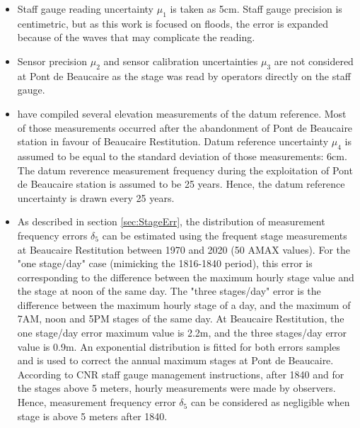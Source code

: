\documentclass[11pt]{article}
\begin{document}
    \begin{itemize}
    
        \item Staff gauge reading uncertainty $\mu_1$ is taken as 5cm. Staff gauge precision is centimetric, but as this work is focused on floods, the error is expanded because of the waves that may complicate the reading. 
        
        \item Sensor precision $\mu_2$ and sensor calibration uncertainties $\mu_3$ are not considered at Pont de Beaucaire as the stage was read by operators directly on the staff gauge.
        
        \item \citet{bard_actualisation_2018} have compiled several elevation measurements of the datum reference. Most of those measurements occurred after the abandonment of Pont de Beaucaire station in favour of Beaucaire Restitution. Datum reference uncertainty $\mu_4$ is assumed to be equal to the standard deviation of those measurements: 6cm. The datum reverence measurement frequency during the exploitation of Pont de Beaucaire station is assumed to be 25 years. Hence, the datum reference uncertainty is drawn every 25 years.
        
        \item As described in section \ref{sec:StageErr}, the distribution of measurement frequency errors $\delta_5$ can be estimated using the frequent stage measurements at Beaucaire Restitution between 1970 and 2020 (50 AMAX values). For the "one stage/day" case (mimicking the 1816-1840 period), this error is corresponding to the difference between the maximum hourly stage value and the stage at noon of the same day. The "three stages/day" error is the difference between the maximum hourly stage of a day, and the maximum of 7AM, noon and 5PM stages of the same day. At Beaucaire Restitution, the one stage/day error maximum value is 2.2m, and the three stages/day error value is 0.9m. An exponential distribution is fitted for both errors samples and is used to correct the annual maximum stages at Pont de Beaucaire. According to CNR staff gauge management instructions, after 1840 and for the stages above 5 meters, hourly measurements were made by observers. Hence, measurement frequency error $\delta_5$ can be considered as negligible when stage is above 5 meters after 1840. 
    \end{itemize}
\end{document}
